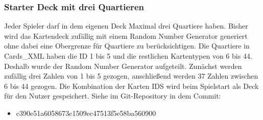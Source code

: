 \subsubsection{Starter Deck mit drei Quartieren}
Jeder Spieler darf in dem eigenen Deck Maximal drei Quartiere haben. Bisher wird das Kartendeck zufällig mit einem Random Number Generator generiert ohne dabei eine Obergrenze für Quartiere zu berücksichtigen. Die Quartiere in Cards\_XML haben die ID 1 bis 5 und die restlichen Kartentypen von 6 bis 44. Deshalb wurde der Random Number Generator aufgeteilt. Zunächst werden zufällig drei Zahlen von 1 bis 5 gezogen, anschließend werden 37 Zahlen zwischen 6 bis 44 gezogen. Die Kombination der Karten IDS wird beim Spielstart als Deck für den Nutzer gespeichert.
Siehe im Git-Repository in dem Commit:
\begin{itemize}
\item c390e51a6058673c1509ec47513f5e58ba560900
\end{itemize}

